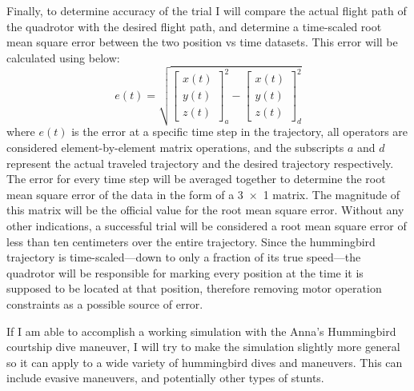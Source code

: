 \documentclass[onecolumn,10pt]{IEEEtran}
\begin{document}
Finally, to determine accuracy of the trial I will compare the actual flight path of the quadrotor with the desired flight path, and determine a time-scaled root mean square error between the two position vs time datasets. This error will be calculated using  below:
\begin{equation}
e(t) = \sqrt{
\begin{bmatrix}
x(t) \\ y(t) \\ z(t)
\end{bmatrix}_a^2 
-
\begin{bmatrix}
x(t) \\ y(t) \\ z(t)
\end{bmatrix}_d^2
}
\label{eq:demonstration-1}
\end{equation}
where $e(t)$ is the error at a specific time step in the trajectory, all operators are considered element-by-element matrix operations, and the subscripts $a$ and $d$ represent the actual traveled trajectory and the desired trajectory respectively. The error for every time step will be averaged together to determine the root mean square error of the data in the form of a \num{3x1} matrix. The magnitude of this matrix will be the official value for the root mean square error. Without any other indications, a successful trial will be considered a root mean square error of less than ten centimeters over the entire trajectory. Since the hummingbird trajectory is time-scaled—down to only a fraction of its true speed—the quadrotor will be responsible for marking every position at the time it is supposed to be located at that position, therefore removing motor operation constraints as a possible source of error.

If I am able to accomplish a working simulation with the Anna’s Hummingbird courtship dive maneuver, I will try to make the simulation slightly more general so it can apply to a wide variety of hummingbird dives and maneuvers. This can include evasive maneuvers, and potentially other types of stunts.
\end{document}

